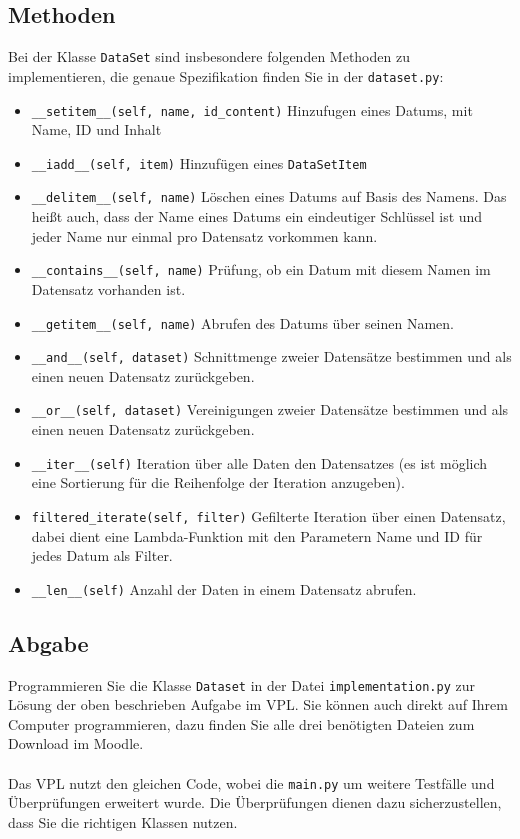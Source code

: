 \documentclass[11pt]{article}
\begin{document}
\subsection{Methoden}
Bei der Klasse \texttt{DataSet} sind insbesondere folgenden Methoden zu implementieren, die genaue Spezifikation finden Sie in der \texttt{dataset.py}:\\
\begin{itemize}
    \item \texttt{\_\_setitem\_\_(self, name, id\_content)} Hinzufugen eines Datums, mit Name, ID und Inhalt
    \item \texttt{\_\_iadd\_\_(self, item)} Hinzufügen eines \texttt{DataSetItem}
    \item \texttt{\_\_delitem\_\_(self, name)} Löschen eines Datums auf Basis des Namens. Das heißt auch, dass der Name eines Datums ein eindeutiger Schlüssel ist und jeder Name nur einmal pro Datensatz vorkommen kann.
    \item \texttt{\_\_contains\_\_(self, name)} Prüfung, ob ein Datum mit diesem Namen im Datensatz vorhanden ist.
    \item \texttt{\_\_getitem\_\_(self, name)} Abrufen des Datums über seinen Namen.
    \item \texttt{\_\_and\_\_(self, dataset)} Schnittmenge zweier Datensätze bestimmen und als einen neuen Datensatz zurückgeben.
    \item \texttt{\_\_or\_\_(self, dataset)} Vereinigungen zweier Datensätze bestimmen und als einen neuen Datensatz zurückgeben.
    \item \texttt{\_\_iter\_\_(self)} Iteration über alle Daten den Datensatzes (es ist möglich eine Sortierung für die Reihenfolge der Iteration anzugeben).
    \item \texttt{filtered\_iterate(self, filter)} Gefilterte Iteration über einen Datensatz, dabei dient eine Lambda-Funktion mit den Parametern Name und ID für jedes Datum als Filter.
    \item \texttt{\_\_len\_\_(self)} Anzahl der Daten in einem Datensatz abrufen.
\end{itemize}

\subsection{Abgabe}

Programmieren Sie die Klasse \texttt{Dataset} in der Datei \texttt{implementation.py} zur Lösung der oben beschrieben Aufgabe im VPL.
Sie können auch direkt auf Ihrem Computer programmieren, dazu finden Sie alle drei benötigten Dateien zum Download im Moodle.\\
\\
Das VPL nutzt den gleichen Code, wobei die \texttt{main.py} um weitere Testfälle und Überprüfungen erweitert wurde.
Die Überprüfungen dienen dazu sicherzustellen, dass Sie die richtigen Klassen nutzen.\\
\end{document}
